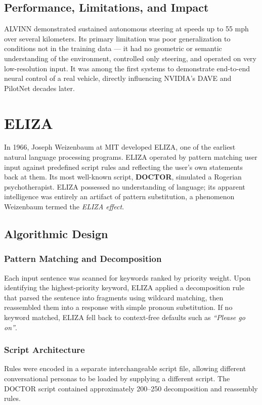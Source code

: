 \documentclass[12pt,a4paper]{report}
\begin{document}
\subsection{Performance, Limitations, and Impact}
ALVINN demonstrated sustained autonomous steering at speeds up to 55 mph over several kilometers. Its primary limitation was poor generalization to conditions not in the training data — it had no geometric or semantic understanding of the environment, controlled only steering, and operated on very low-resolution input. It was among the first systems to demonstrate end-to-end neural control of a real vehicle, directly influencing NVIDIA's DAVE and PilotNet decades later.

\section{ELIZA}
In 1966, Joseph Weizenbaum at MIT developed ELIZA, one of the earliest natural language processing programs. ELIZA operated by pattern matching user input against predefined script rules and reflecting the user's own statements back at them. Its most well-known script, \textbf{DOCTOR}, simulated a Rogerian psychotherapist. ELIZA possessed no understanding of language; its apparent intelligence was entirely an artifact of pattern substitution, a phenomenon Weizenbaum termed the \textit{ELIZA effect}.

\subsection{Algorithmic Design}

\subsubsection{Pattern Matching and Decomposition}
Each input sentence was scanned for keywords ranked by priority weight. Upon identifying the highest-priority keyword, ELIZA applied a decomposition rule that parsed the sentence into fragments using wildcard matching, then reassembled them into a response with simple pronoun substitution. If no keyword matched, ELIZA fell back to context-free defaults such as \textit{``Please go on''}.

\subsubsection{Script Architecture}
Rules were encoded in a separate interchangeable script file, allowing different conversational personas to be loaded by supplying a different script. The DOCTOR script contained approximately 200--250 decomposition and reassembly rules.
\end{document}
